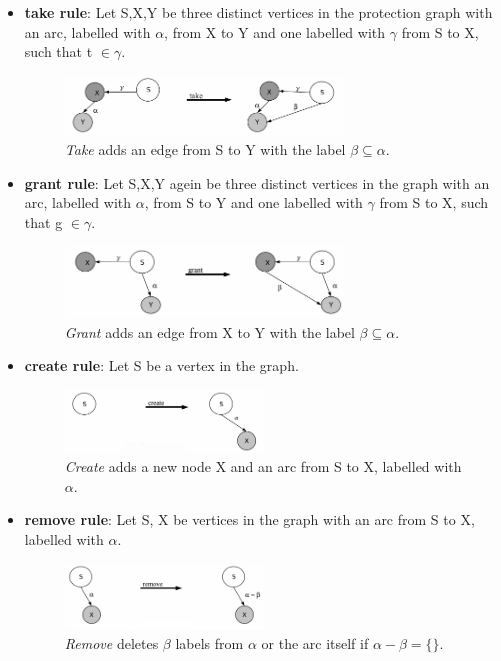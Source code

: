 \documentclass[11pt,a4paper,twoside]{article}
\begin{document}
	\begin{itemize}
	\item \textbf{take rule}: Let S,X,Y be three distinct vertices in the protection graph with an arc, labelled with $\alpha$, from X to Y and one labelled with $\gamma$ from S to X, such that t $\in \gamma.$  
	\begin{figure}[ht]
	\centering
		\includegraphics[width=0.7\textwidth]{./Pictures/takeRule.png}
	\caption[take rule]{\textit{Take} adds an edge from S to Y with the label $\beta \subseteq \alpha$. \cite{TakeG}}
	\label{fig:cltake}
	\end{figure}		
	\item \textbf{grant rule}:	Let S,X,Y agein be three distinct vertices in the graph with an arc, labelled with  $\alpha$, from S to Y and one labelled with $\gamma$ from S to X, such that g $\in \gamma$. 
	\begin{figure}[ht]
	\centering
		\includegraphics[width=0.7\textwidth]{./Pictures/grantRule.png}
	\caption[grant rule]{\textit{Grant} adds an edge from X to Y with the label $\beta \subseteq \alpha$.  \cite{TakeG}}
	\label{fig:clgrant}
	\end{figure}		
	\item \textbf{create rule}: Let S be a vertex in the graph. 
	\begin{figure}[H]
	\centering
		\includegraphics[width=0.5\textwidth]{./Pictures/createRule.png}
	\caption[create rule]{\textit{Create} adds a new node X and an arc from S to X, labelled with $\alpha$. \cite{TakeG}}
	\label{fig:clcreate}
	\end{figure}	
	\item \textbf{remove rule}: Let S, X be vertices in the graph with an arc from S to X, labelled with $\alpha$. 
	\begin{figure}[ht]
	\centering
		\includegraphics[width=0.5\textwidth]{./Pictures/removeRule.png}
	\caption[remove rule]{\textit{Remove} deletes $\beta$ labels from $\alpha$ or the arc itself if $\alpha - \beta = \lbrace\rbrace$. \cite{TakeG}}
	\label{fig:clremove}
	\end{figure}		
	\end{itemize}	
\end{document}
